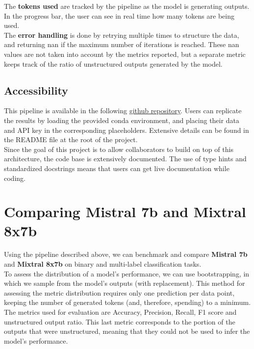 \documentclass[11pt]{article}
\begin{document}
The \textbf{tokens used} are tracked by the pipeline as the model is generating outputs. In the progress bar, the user can see in real time how many tokens are being used.\\

The \textbf{error handling} is done by retrying multiple times to structure the data, and returning nan if the maximum number of iterations is reached. These nan values are not taken into account by the metrics reported, but a separate metric keeps track of the ratio of unstructured outputs generated by the model.

\subsection{Accessibility}
This pipeline is available in the following \href{https://github.com/tsounack/LLM_evaluation_pipeline}{github repository}. Users can replicate the results by loading the provided conda environment, and placing their data and API key in the corresponding placeholders. Extensive details can be found in the README file at the root of the project.\\

Since the goal of this project is to allow collaborators to build on top of this architecture, the code base is extensively documented. The use of type hints and standardized docstrings means that users can get live documentation while coding.

\section{Comparing Mistral 7b and Mixtral 8x7b}

Using the pipeline described above, we can benchmark and compare \textbf{Mistral 7b} and \textbf{Mixtral 8x7b} on binary and multi-label classification tasks.\\

To assess the distribution of a model's performance, we can use bootstrapping, in which we sample from the model's outputs (with replacement). This method for assessing the metric distribution requires only one prediction per data point, keeping the number of generated tokens (and, therefore, spending) to a minimum.\\

The metrics used for evaluation are Accuracy, Precision, Recall, F1 score and unstructured output ratio. This last metric corresponds to the portion of the outputs that were unstructured, meaning that they could not be used to infer the model's performance.
\end{document}
